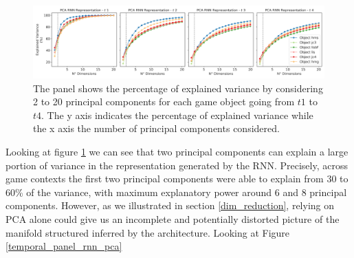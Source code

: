 \begin{figure}[!htb]
\centering
\includegraphics[width=\textwidth]{images/chapter_4/pca_embedding.png}
\caption[\textbf{Principal component analysis of the hidden units activation of the RNN architecture }]{The panel shows the percentage of explained variance by considering 2 to 20 principal components for each game object going from $t1$ to $t4$. The y axis indicates the percentage of explained variance while the x axis the number of principal components considered.}
\label{pca_emb} 
\end{figure}

Looking at figure \ref{pca_emb} we can see that two principal components can explain a large portion of variance in the representation generated by the RNN. Precisely, across game contexts the first two principal components were able to explain from 30 to 60\% of the variance, with maximum explanatory power around 6 and 8 principal components. However, as we illustrated in section \ref{dim_reduction}, relying on PCA alone could give us an incomplete and potentially distorted picture of the manifold structured inferred by the architecture. Looking at Figure \ref{temporal_panel_rnn_pca} 

